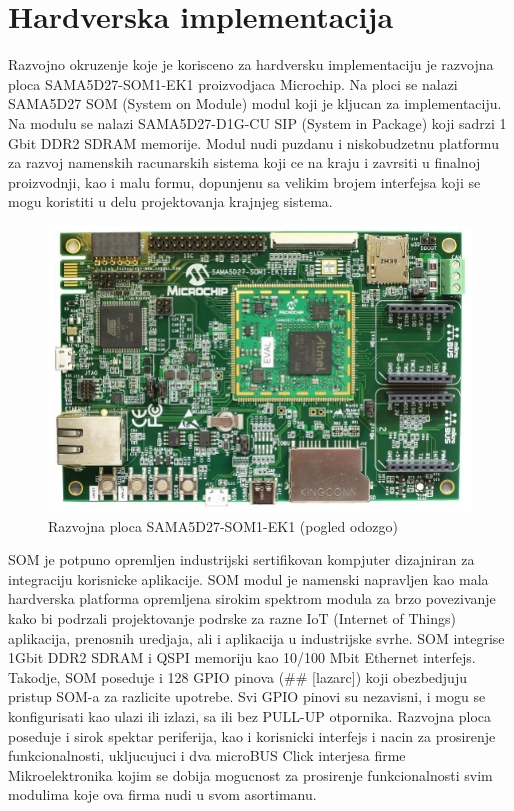 \documentclass[a4paper,12pt, master]{etf}
\begin{document}
	\newpage

	\chapter{Hardverska implementacija}

	Razvojno okruzenje koje je korisceno za hardversku implementaciju je razvojna ploca
	SAMA5D27-SOM1-EK1 proizvodjaca Microchip. Na ploci se nalazi SAMA5D27 SOM (System on Module)
	modul koji je kljucan za implementaciju. Na modulu se nalazi SAMA5D27-D1G-CU SIP (System in
	Package) koji sadrzi 1 Gbit DDR2 SDRAM memorije. Modul nudi puzdanu i niskobudzetnu platformu
	za razvoj namenskih racunarskih sistema koji ce na kraju i zavrsiti u finalnoj proizvodnji, kao
	i malu formu, dopunjenu sa velikim brojem interfejsa koji se mogu koristiti u delu
	projektovanja krajnjeg sistema.

	\begin{figure}[htb]
		\centering
		\includegraphics[scale=.7]{../pic/hw_top_view.png}
		\caption{Razvojna ploca SAMA5D27-SOM1-EK1 (pogled odozgo)}
		\label{fig:hw_top_view}
	\end{figure}


	SOM je potpuno opremljen industrijski sertifikovan kompjuter dizajniran za integraciju
	korisnicke aplikacije. SOM modul je namenski napravljen kao mala hardverska platforma
	opremljena sirokim spektrom modula za brzo povezivanje kako bi podrzali	projektovanje podrske
	za razne IoT (Internet of Things) aplikacija, prenosnih uredjaja, ali i aplikacija u
	industrijske svrhe. SOM integrise 1Gbit DDR2 SDRAM i QSPI memoriju kao 10/100 Mbit Ethernet
	interfejs. Takodje, SOM poseduje i 128 GPIO pinova (\#\# [lazarc]) koji	obezbedjuju pristup
	SOM-a za razlicite upotrebe. Svi GPIO pinovi su nezavisni, i mogu se konfigurisati kao ulazi
	ili izlazi, sa ili bez PULL-UP otpornika. Razvojna ploca poseduje i	sirok spektar periferija,
	kao i korisnicki interfejs i nacin za prosirenje funkcionalnosti, ukljucujuci i dva microBUS
	Click interjesa firme Mikroelektronika kojim se dobija mogucnost za	prosirenje funkcionalnosti
	svim modulima koje ova firma nudi u svom asortimanu.
\end{document}
